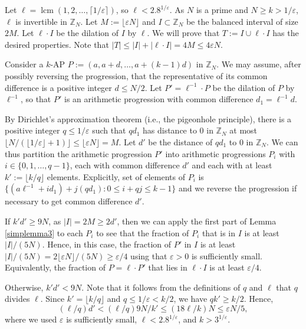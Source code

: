 \documentclass[11pt]{article}
\makeatletter
\DeclareMathOperator{\lcm}{lcm}
\numberwithin{equation}{section}
\renewenvironment{proof}[1][\proofname]{\par
  \vspace{-\topsep}%
  \pushQED{\qed}%
  \normalfont
  \topsep0pt \partopsep0pt %
  \trivlist
  \item[\hskip\labelsep
        \itshape
    #1\@addpunct{.}]\ignorespaces
}{%
  \popQED\endtrivlist\@endpefalse
  \addvspace{6pt plus 6pt} %
}
\theoremstyle{definition}
\theoremstyle{remark}
\makeatother
\begin{document}
\begin{proof}[Proof of Lemma \ref{intervaltocyclic}]
Let $\ell=\lcm(1,2,\ldots,\lceil 1/\varepsilon\rceil)$, so $\ell < 2.8^{1/\varepsilon}$. As $N$ is a prime and $N \geq k>1/\varepsilon$, $\ell$ is invertible in $\mathbb{Z}_N$. Let $M:=\lfloor \varepsilon N \rfloor$ and $I \subset \mathbb{Z}_N$ be the balanced interval of size $2M$. Let $\ell \cdot I$ be the dilation of $I$ by $\ell$.  We will prove that $T:=I \cup \ell \cdot I$ has the desired properties. Note that $|T| \leq |I|+|\ell \cdot I|= 4M \leq 4\varepsilon N$.

Consider a $k$-AP $P:=(a,a+d,\ldots,a+(k-1)d)$ in $\mathbb{Z}_N$. We may assume, after possibly reversing the progression, that the representative of its common difference is a positive integer $d \leq N/2$. Let $P' = \ell^{-1} \cdot P$ be the dilation of $P$ by $\ell^{-1}$, so that $P'$ is an arithmetic progression with common difference $d_1=\ell^{-1}d$. %

By Dirichlet's approximation theorem (i.e., the pigeonhole principle), there is a positive integer $q \leq 1/\varepsilon$ such that $qd_1$ has distance to $0$ in $\mathbb{Z}_N$ at most $\lfloor N/(\lfloor 1/\varepsilon \rfloor+1)\rfloor \leq \lfloor \varepsilon N \rfloor =M$. Let $d'$ be the distance of $qd_1$ to $0$ in $\mathbb{Z}_N$. We can thus partition the arithmetic progression $P'$ into arithmetic progressions $P_i$ with $i \in \{0,1,\ldots,q-1\}$, each with common difference $d'$ and each with at least $k':=\lfloor k/q \rfloor$ elements. Explicitly, set of elements of $P_i$ is $\{(a\ell^{-1}+id_1)+j(qd_1):0 \leq i+qj \leq k-1\}$ and we reverse the progression if necessary to get common difference $d'$. %

If $k'd' \geq 9N$, as $|I| =2M \geq 2d'$, then we can apply the first part of Lemma \ref{simplemma3} to each $P_i$ to see that the fraction of $P_i$ that is in $I$ is at least $|I|/(5N)$. Hence, in this case, the fraction of $P'$ in $I$ is at least $|I|/(5N)=2\lfloor \varepsilon N\rfloor/(5N) \geq \varepsilon/4$ using that $\varepsilon>0$ is sufficiently small.  Equivalently, the fraction of $P=\ell \cdot P'$ that lies in $\ell  \cdot I$ is at least $\varepsilon/4$. 

Otherwise, $k'd' < 9N$. Note that it follows from the definitions of $q$ and $\ell$ that $q$ divides $\ell$. Since $k'=\lfloor k/q \rfloor$ and $q \leq 1/\varepsilon < k/2$, we have $qk' \geq k/2$. Hence, $$(\ell/q)d' < (\ell/q)9N/k' \leq  (18\ell/k)N \leq \varepsilon N/5,$$ where we used $\varepsilon$ is sufficiently small, $\ell<2.8^{1/\varepsilon}$, and $k>3^{1/\varepsilon}$. 


\end{proof}
\end{document}
